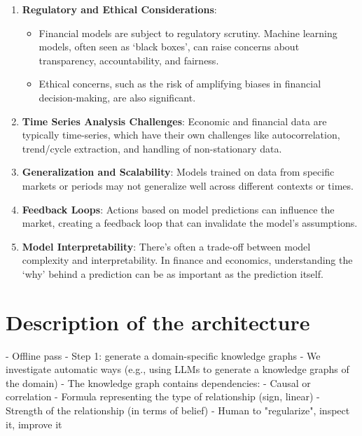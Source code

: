 \documentclass[11pt, reqno]{amsart}
\theoremstyle{definition}
\theoremstyle{remark}
\begin{document}
\begin{enumerate}
		\item \textbf{Regulatory and Ethical Considerations}:
			\begin{itemize}
				\item Financial models are subject to regulatory scrutiny. Machine
					learning models, often seen as `black boxes', can raise concerns
					about transparency, accountability, and fairness.

				\item Ethical concerns, such as the risk of amplifying biases in
					financial decision-making, are also significant.
			\end{itemize}

		\item \textbf{Time Series Analysis Challenges}: Economic and financial data
			are typically time-series, which have their own challenges like
			autocorrelation, trend/cycle extraction, and handling of non-stationary
			data.

		\item \textbf{Generalization and Scalability}: Models trained on data from
			specific markets or periods may not generalize well across different contexts
			or times.

		\item \textbf{Feedback Loops}: Actions based on model predictions can influence
			the market, creating a feedback loop that can invalidate the model's
			assumptions.

		\item \textbf{Model Interpretability}: There's often a trade-off between
			model complexity and interpretability. In finance and economics, understanding
			the `why' behind a prediction can be as important as the prediction itself.
	\end{enumerate}

    \section{Description of the architecture}

    - Offline pass
      - Step 1: generate a domain-specific knowledge graphs
        - We investigate automatic ways (e.g., using LLMs to generate a knowledge
          graphs of the domain)
        - The knowledge graph contains dependencies:
          - Causal or correlation
          - Formula representing the type of relationship (sign, linear)
          - Strength of the relationship (in terms of belief)
        - Human to "regularize", inspect it, improve it
\end{document}
